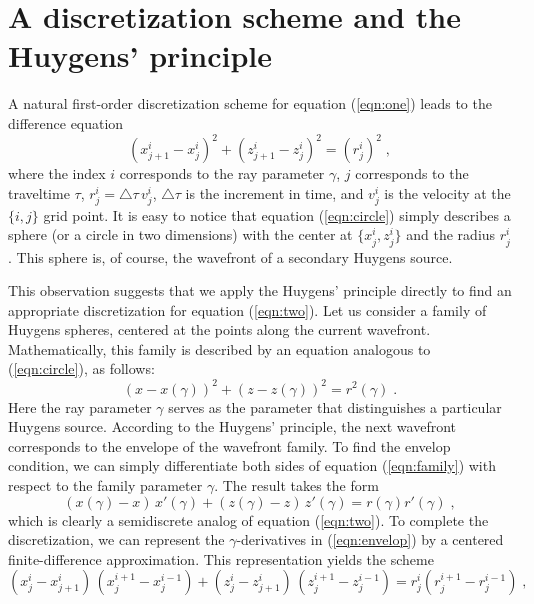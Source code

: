 \section{A discretization scheme and the Huygens' principle}
A natural first-order discretization scheme for equation (\ref{eqn:one}) leads
to the difference equation
\begin{equation}
  \label{eqn:circle}
  \left(x_{j+1}^i-x_j^i\right)^2 + 
  \left(z_{j+1}^i-z_j^i\right)^2 = \left(r_j^i\right)^2\;,
\end{equation}
where the index $i$ corresponds to the ray parameter $\gamma$, $j$
corresponds to the traveltime $\tau$, $r_j^i = \triangle \tau\,v_j^i$,
$\triangle \tau$ is the increment in time, and $v_j^i$ is the velocity
at the $\{i,j\}$ grid point. It is easy to notice that equation
(\ref{eqn:circle}) simply describes a sphere (or a circle in two
dimensions) with the center at $\{ x_j^i, z_j^i \}$ and the radius
$r_j^i$. This sphere is, of course, the wavefront of a secondary Huygens
source. 
\par
This observation suggests that we apply the Huygens' principle
directly to find an appropriate discretization for equation
(\ref{eqn:two}). Let us consider a family of Huygens spheres, centered
at the points along the current wavefront. Mathematically, this family
is described by an equation analogous to (\ref{eqn:circle}), as follows:
\begin{equation}
  \label{eqn:family}
  \left(x-x (\gamma)\right)^2 + 
  \left(z-z (\gamma)\right)^2 = r^2 (\gamma)\;.
\end{equation}
Here the ray parameter $\gamma$ serves as the parameter that
distinguishes a particular Huygens source. According to the Huygens'
principle, the next wavefront corresponds to the envelope of the
wavefront family. To find the envelop condition, we can simply
differentiate both sides of equation (\ref{eqn:family}) with respect to
the family parameter $\gamma$. The result takes the form 
\begin{equation}
  \label{eqn:envelop}
  \left(x (\gamma) - x \right)\, x'(\gamma) + 
  \left(z (\gamma) - z \right)\, z'(\gamma) = r (\gamma) r'(\gamma)\;,
\end{equation}
which is clearly a semidiscrete analog of equation (\ref{eqn:two}).
To complete the discretization, we can represent the
$\gamma$-derivatives in (\ref{eqn:envelop}) by a centered
finite-difference approximation. This representation yields the scheme
\begin{equation}
  \label{eqn:line}
  \left(x_j^i - x_{j+1}^i \right)\, \left(x_j^{i+1} - x_j^{i-1}\right) + 
  \left(z_j^i - z_{j+1}^i \right)\, \left(z_j^{i+1} - z_j^{i-1}\right)  
  = r_j^i \left(r_j^{i+1} - r_j^{i-1}\right)\;,
\end{equation}
